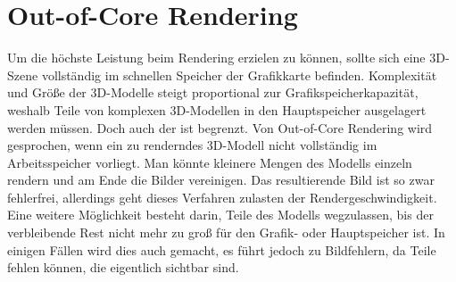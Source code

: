 \section{Out-of-Core Rendering}
\label{sec:relwork:oocrender}
Um die höchste Leistung beim Rendering erzielen zu können, sollte sich eine 3D-Szene vollständig im schnellen Speicher der Grafikkarte befinden. Komplexität und Größe der 3D-Modelle steigt proportional zur Grafikspeicherkapazität, weshalb Teile von komplexen 3D-Modellen in den Hauptspeicher ausgelagert werden müssen. Doch auch der ist begrenzt. Von Out-of-Core Rendering wird gesprochen, wenn ein zu renderndes 3D-Modell nicht vollständig im Arbeitsspeicher vorliegt. Man könnte kleinere Mengen des Modells einzeln rendern und am Ende die Bilder vereinigen. Das resultierende Bild ist so zwar fehlerfrei, allerdings geht dieses Verfahren zulasten der Rendergeschwindigkeit. Eine weitere Möglichkeit besteht darin, Teile des Modells wegzulassen, bis der verbleibende Rest nicht mehr zu groß für den Grafik- oder Hauptspeicher ist. In einigen Fällen wird dies auch gemacht, es führt jedoch zu Bildfehlern, da Teile fehlen können, die eigentlich sichtbar sind.

